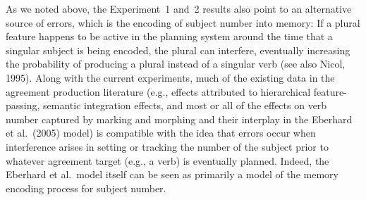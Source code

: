 \documentclass[12pt,titlepage]{article}
\begin{document}
As we noted above, the Experiment~1 and~2 results also point to an
alternative source of errors, which is the encoding of subject number into
memory: If a plural feature happens to be active in the planning system
around the time that a singular subject is being encoded, the plural can
interfere, eventually increasing the probability of producing a plural
instead of a singular verb (see also Nicol, 1995).  Along with the current
experiments, much of the existing data in the agreement production
literature (e.g., effects attributed to hierarchical feature-passing,
semantic integration effects, and most or all of the effects on verb number
captured by marking and morphing and their interplay in the Eberhard et
al.\ (2005) model) is compatible with the idea that errors occur when
interference arises in setting or tracking the number of the subject prior
to whatever agreement target (e.g., a verb) is eventually planned.  Indeed,
the Eberhard et al.\ model itself can be seen as primarily a model of the
memory encoding process for subject number.
\end{document}
